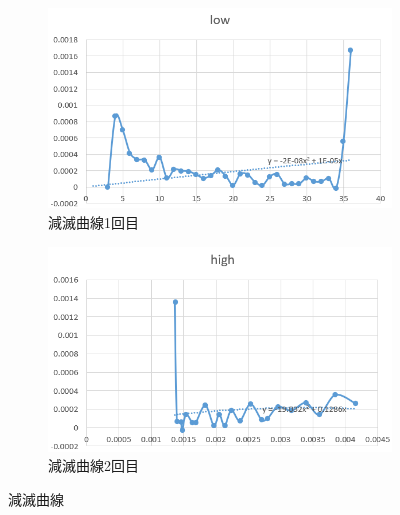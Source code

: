\documentclass[dvipdfmx,a4paper]{jreport} %
\begin{document}
 \begin{figure}[H] %
     \centering
     \begin{subfigure}[b]{0.45\textwidth}
         \includegraphics[width=\textwidth]{summer/ship-experiment/long-pool/extinction_curve_01.png} %
         \caption{減滅曲線1回目}
         \label{fig:extinction_curve_01}
     \end{subfigure}
     \hfill
     \begin{subfigure}[b]{0.45\textwidth}
         \includegraphics[width=\textwidth]{summer/ship-experiment/long-pool/extinction_curve_02.png} %
         \caption{減滅曲線2回目}
         \label{fig:extinction_curve_02}
     \end{subfigure}
     \label{extinction_curve}
     \caption{減滅曲線}
 \end{figure}
\end{document}
